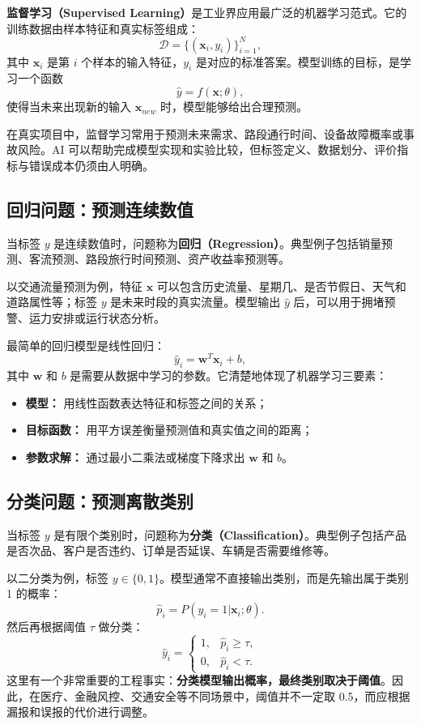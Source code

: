 \textbf{监督学习（Supervised Learning）}是工业界应用最广泛的机器学习范式。它的训练数据由样本特征和真实标签组成：
\[
\mathcal{D}=\{(\mathbf{x}_i,y_i)\}_{i=1}^{N},
\]
其中 $\mathbf{x}_i$ 是第 $i$ 个样本的输入特征，$y_i$ 是对应的标准答案。模型训练的目标，是学习一个函数
\[
\hat{y}=f(\mathbf{x};\theta),
\]
使得当未来出现新的输入 $\mathbf{x}_{new}$ 时，模型能够给出合理预测。

在真实项目中，监督学习常用于预测未来需求、路段通行时间、设备故障概率或事故风险。AI 可以帮助完成模型实现和实验比较，但标签定义、数据划分、评价指标与错误成本仍须由人明确。

\subsection{回归问题：预测连续数值}

当标签 $y$ 是连续数值时，问题称为\textbf{回归（Regression）}。典型例子包括销量预测、客流预测、路段旅行时间预测、资产收益率预测等。

以交通流量预测为例，特征 $\mathbf{x}$ 可以包含历史流量、星期几、是否节假日、天气和道路属性等；标签 $y$ 是未来时段的真实流量。模型输出 $\hat{y}$ 后，可以用于拥堵预警、运力安排或运行状态分析。

最简单的回归模型是线性回归：
\[
\hat{y}_i = \mathbf{w}^{T}\mathbf{x}_i + b,
\]
其中 $\mathbf{w}$ 和 $b$ 是需要从数据中学习的参数。它清楚地体现了机器学习三要素：
\begin{itemize}
    \item \textbf{模型：} 用线性函数表达特征和标签之间的关系；
    \item \textbf{目标函数：} 用平方误差衡量预测值和真实值之间的距离；
    \item \textbf{参数求解：} 通过最小二乘法或梯度下降求出 $\mathbf{w}$ 和 $b$。
\end{itemize}

\subsection{分类问题：预测离散类别}

当标签 $y$ 是有限个类别时，问题称为\textbf{分类（Classification）}。典型例子包括产品是否次品、客户是否违约、订单是否延误、车辆是否需要维修等。

以二分类为例，标签 $y\in\{0,1\}$。模型通常不直接输出类别，而是先输出属于类别 1 的概率：
\[
\hat{p}_i=P(y_i=1|\mathbf{x}_i;\theta).
\]
然后再根据阈值 $\tau$ 做分类：
\[
\hat{y}_i =
\begin{cases}
1, & \hat{p}_i \ge \tau,\\
0, & \hat{p}_i < \tau.
\end{cases}
\]
这里有一个非常重要的工程事实：\textbf{分类模型输出概率，最终类别取决于阈值}。因此，在医疗、金融风控、交通安全等不同场景中，阈值并不一定取 0.5，而应根据漏报和误报的代价进行调整。

